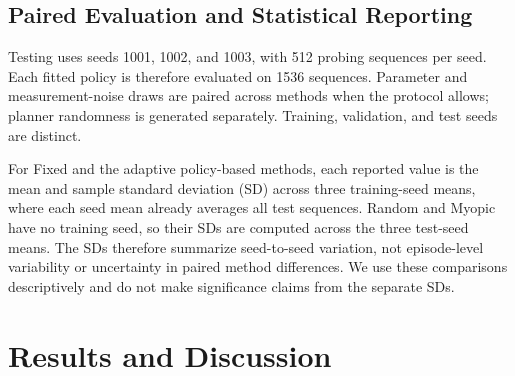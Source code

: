 \documentclass[conference,letterpaper]{IEEEtran}
\begin{document}
\subsection{Paired Evaluation and Statistical Reporting}\label{sec:evaluation}
Testing uses seeds 1001, 1002, and 1003, with 512 probing sequences per seed. Each fitted policy is therefore evaluated on 1536 sequences. Parameter and measurement-noise draws are paired across methods when the protocol allows; planner randomness is generated separately. Training, validation, and test seeds are distinct.

For Fixed and the adaptive policy-based methods, each reported value is the mean and sample standard deviation (SD) across three training-seed means, where each seed mean already averages all test sequences. Random and Myopic have no training seed, so their SDs are computed across the three test-seed means. The SDs therefore summarize seed-to-seed variation, not episode-level variability or uncertainty in paired method differences. We use these comparisons descriptively and do not make significance claims from the separate SDs.

\section{Results and Discussion}\label{sec:results}
\end{document}
